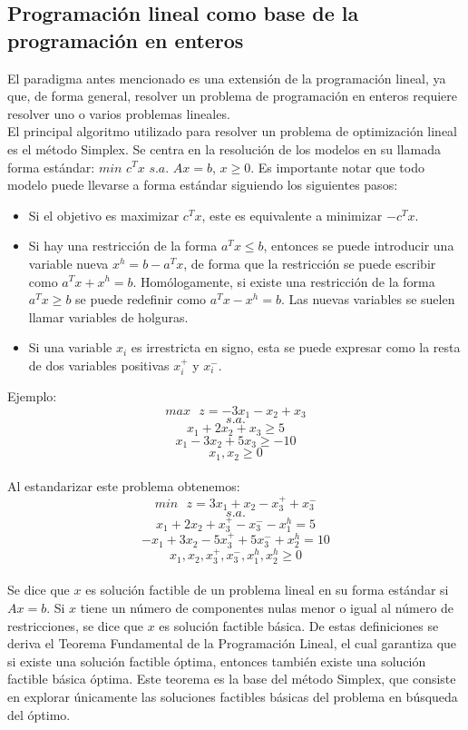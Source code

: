 \documentclass[12pt]{report}
\begin{document}
\subsection{Programación lineal como base de la programación en enteros\\}

El paradigma antes mencionado es una extensión de la programación lineal, ya que, de forma general, resolver un problema de programación en enteros requiere resolver uno o varios problemas lineales.\\

El principal algoritmo utilizado para resolver un problema de optimización lineal es el método Simplex. Se centra en la resolución de los modelos en su llamada forma estándar: $min$ $c^Tx$ $s.a.$ $Ax=b$, $x\geq 0$. Es importante notar que todo modelo puede llevarse a forma estándar siguiendo los siguientes pasos:
\begin{itemize}
    \item Si el objetivo es maximizar $c^Tx$, este es equivalente a minimizar $-c^Tx$.
    \item Si hay una restricción de la forma $a^Tx\leq b$, entonces se puede introducir una variable nueva $x^h=b-a^Tx$, de forma que la restricción se puede escribir como $a^Tx+x^h=b$. Homólogamente, si existe una restricción de la forma $a^Tx\geq b$ se puede redefinir como $a^Tx-x^h=b$. Las nuevas variables se suelen llamar variables de holguras.
    \item Si una variable $x_i$ es irrestricta en signo, esta se puede expresar como la resta de dos variables positivas $x_i^+$ y $x_i^-$.\\
\end{itemize}

Ejemplo:
$$max \text{ }z= -3x_1-x_2+x_3$$
$$s.a.$$
$$x_1+2x_2+x_3\geq 5$$
$$x_1-3x_2+5x_3\geq -10$$
$$x_1,x_2\geq 0$$\\

Al estandarizar este problema obtenemos:
$$min \text{ }z= 3x_1+x_2-x_3^++x_3^-$$
$$s.a.$$
$$x_1+2x_2+x_3^+-x_3^--x_1^h=5$$
$$-x_1+3x_2-5x_3^++5x_3^-+x_2^h=10$$
$$x_1,x_2,x_3^+,x_3^-,x_1^h,x_2^h\geq 0$$\\

Se dice que $x$ es solución factible de un problema lineal en su forma estándar si $Ax=b$. Si $x$ tiene un número de componentes nulas menor o igual al número de restricciones, se dice que $x$ es solución factible básica. De estas definiciones se deriva el Teorema Fundamental de la Programación Lineal, el cual garantiza que si existe una solución factible óptima, entonces también existe una solución factible básica óptima. Este teorema es la base del método Simplex, que consiste en explorar únicamente las soluciones factibles básicas del problema en búsqueda del óptimo.\\
\end{document}
